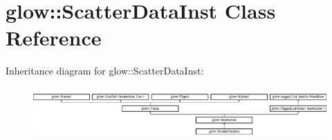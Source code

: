 \hypertarget{classglow_1_1_scatter_data_inst}{}\section{glow\+:\+:Scatter\+Data\+Inst Class Reference}
\label{classglow_1_1_scatter_data_inst}
Inheritance diagram for glow\+:\+:Scatter\+Data\+Inst\+:\begin{figure}[H]
\begin{center}
\leavevmode
\includegraphics[height=1.991111cm]{classglow_1_1_scatter_data_inst}
\end{center}
\end{figure}
